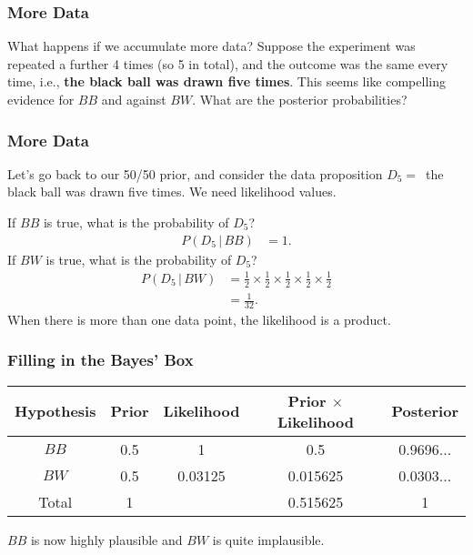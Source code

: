 \documentclass{beamer}
\newcommand{\given}{\,|\,}
\begin{document}
\begin{frame}
\frametitle{More Data}
What happens if we accumulate more data? Suppose the experiment was repeated
a further 4 times (so 5 in total), and the outcome was the same every time,
i.e., {\bf the black ball was drawn five times}. This seems like compelling
evidence for $BB$ and against $BW$. What are the posterior probabilities?

\end{frame}

\begin{frame}
\frametitle{More Data}
Let's go back to our 50/50 prior, and consider the data
proposition $D_5 = $~the black ball was drawn five times.
We need likelihood values.\pause

If $BB$ is true, what is the probability of $D_5$?
\begin{align}
P(D_5 \given BB) &= 1.
\end{align}
\pause
If $BW$ is true, what is the probability of $D_5$?
\begin{align}
P(D_5 \given BW) &= \frac{1}{2}\times\frac{1}{2}\times\frac{1}{2}\times
                    \frac{1}{2}\times\frac{1}{2}\\
                 &= \frac{1}{32}.
\end{align}\pause
When there is more than one data point, the likelihood is a
product.

\end{frame}


\begin{frame}
\frametitle{Filling in the Bayes' Box}
\begin{tabular}{|c|c|c|c|c|}
\hline
Hypothesis & Prior & Likelihood & Prior $\times$ Likelihood & Posterior \\
\hline
$BB$ & 0.5 & 1 & 0.5 & 0.9696... \\
$BW$ & 0.5 & 0.03125 & 0.015625 & 0.0303... \\
\hline
Total & 1 & & 0.515625 & 1\\
\hline
\end{tabular}
\pause

$BB$ is now highly plausible and $BW$ is quite implausible.

\end{frame}
\end{document}
